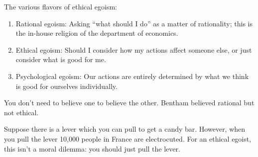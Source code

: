 The various flavors of ethical egoism:
\begin{enumerate}
\item Rational egoism: Asking ``what should I do'' as a matter of rationality; this is the in-house religion of the department of economics.
\item Ethical egoism: Should I consider how my actions affect someone else, or just consider what is good for me.
\item Psychological egoism: Our actions are entirely determined by what we think is good for ourselves individually.
\end{enumerate}
You don't need to believe one to believe the other. Bentham believed rational but not ethical.

\begin{example}
Suppose there is a lever which you can pull to get a candy bar. However, when you pull the lever 10,000 people in France are electrocuted. For an ethical egoist, this isn't a moral dilemma: you should just pull the lever.
\end{example}